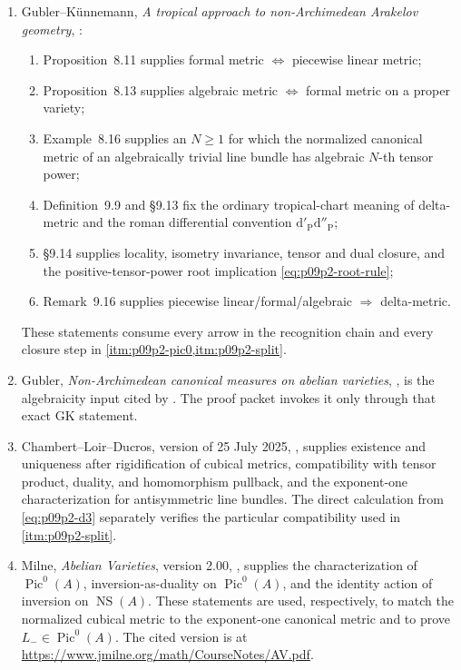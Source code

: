 \begin{enumerate}
\item Gubler--K\"unnemann,
\emph{A tropical approach to non-Archimedean Arakelov geometry},
\cite{GK17}:
 \begin{enumerate}
 \item Proposition~8.11 supplies formal metric
 \(\Longleftrightarrow\) piecewise linear metric;
 \item Proposition~8.13 supplies algebraic metric
 \(\Longleftrightarrow\) formal metric on a proper variety;
 \item Example~8.16 supplies an \(N\geq1\) for which the normalized
 canonical metric of an algebraically trivial line bundle has algebraic
 \(N\)-th tensor power;
 \item Definition~9.9 and \S9.13 fix the ordinary tropical-chart meaning
 of delta-metric and the roman differential convention
 \(\mathrm d'_{\mathrm P}\mathrm d''_{\mathrm P}\);
 \item \S9.14 supplies locality, isometry invariance, tensor and dual
 closure, and the positive-tensor-power root implication
 \eqref{eq:p09p2-root-rule};
 \item Remark~9.16 supplies piecewise linear/formal/algebraic
 \(\Longrightarrow\) delta-metric.
 \end{enumerate}
These statements consume every arrow in the recognition chain and every
closure step in \cref{itm:p09p2-pic0,itm:p09p2-split}.

\item Gubler, \emph{Non-Archimedean canonical measures on abelian
varieties}, \cite[Example~3.7]{Gub10CM}, is the algebraicity input cited by
\cite[Example~8.16]{GK17}.  The proof packet invokes it only through that
exact GK statement.

\item Chambert--Loir--Ducros, version of 25 July 2025,
\cite[Lemmas~19.1.4 and 19.1.6]{CLD25}, supplies existence and uniqueness
after rigidification of cubical metrics, compatibility with tensor product,
duality, and homomorphism pullback, and the exponent-one characterization
for antisymmetric line bundles.  The direct calculation from
\eqref{eq:p09p2-d3} separately verifies the particular compatibility used
in \cref{itm:p09p2-split}.

\item Milne, \emph{Abelian Varieties}, version 2.00,
\cite[Proposition~8.4, Remark~8.5, and Remark~10.19]{milneAV}, supplies the
characterization of \(\operatorname{Pic}^0(A)\), inversion-as-duality on
\(\operatorname{Pic}^0(A)\), and the identity action of inversion on
\(\operatorname{NS}(A)\).  These statements are used, respectively, to
match the normalized cubical metric to the exponent-one canonical metric
and to prove \(L_-\in\operatorname{Pic}^0(A)\).  The cited version is at
\url{https://www.jmilne.org/math/CourseNotes/AV.pdf}.


\end{enumerate}
